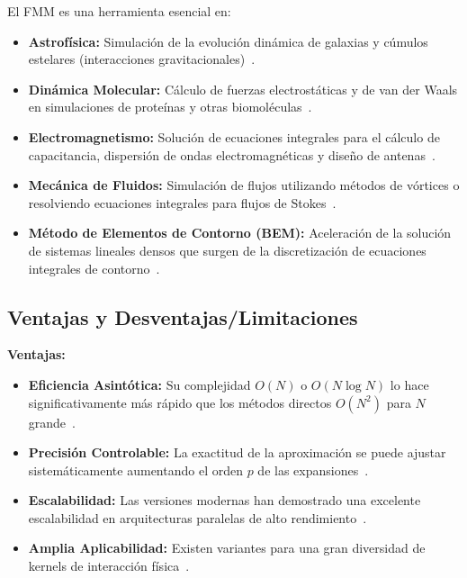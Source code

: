 El FMM es una herramienta esencial en:
\begin{itemize}
    \item \textbf{Astrofísica:} Simulación de la evolución dinámica de galaxias y cúmulos estelares (interacciones gravitacionales)~\cite{Dehnen2002, Cipra2000}.
    \item \textbf{Dinámica Molecular:} Cálculo de fuerzas electrostáticas y de van der Waals en simulaciones de proteínas y otras biomoléculas~\cite{BeatsonGreengard1997}.
    \item \textbf{Electromagnetismo:} Solución de ecuaciones integrales para el cálculo de capacitancia, dispersión de ondas electromagnéticas y diseño de antenas~\cite{ChengEtAl1999, Martinsson2012}.
    \item \textbf{Mecánica de Fluidos:} Simulación de flujos utilizando métodos de vórtices o resolviendo ecuaciones integrales para flujos de Stokes~\cite{BeatsonGreengard1997}.
    \item \textbf{Método de Elementos de Contorno (BEM):} Aceleración de la solución de sistemas lineales densos que surgen de la discretización de ecuaciones integrales de contorno~\cite{ChenSF, Martinsson2012}.
\end{itemize}

\subsection{Ventajas y Desventajas/Limitaciones}

\textbf{Ventajas:}
\begin{itemize}
    \item \textbf{Eficiencia Asintótica:} Su complejidad $O(N)$ o $O(N \log N)$ lo hace significativamente más rápido que los métodos directos $O(N^2)$ para $N$ grande~\cite{GreengardRokhlin1987}.
    \item \textbf{Precisión Controlable:} La exactitud de la aproximación se puede ajustar sistemáticamente aumentando el orden $p$ de las expansiones~\cite{BeatsonGreengard1997}.
    \item \textbf{Escalabilidad:} Las versiones modernas han demostrado una excelente escalabilidad en arquitecturas paralelas de alto rendimiento~\cite{YokotaBarba2012}.
    \item \textbf{Amplia Aplicabilidad:} Existen variantes para una gran diversidad de kernels de interacción física~\cite{Martinsson2012}.
\end{itemize}

